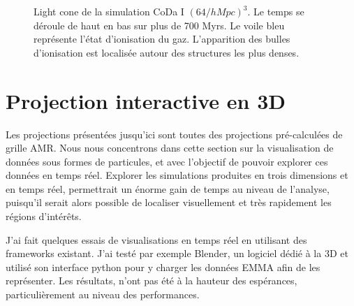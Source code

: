 \begin{figure}
        \caption[Light cone]{Light cone de la simulation CoDa I $(64/h Mpc)^3$. 
        Le temps se déroule de haut en bas sur plus de 700 Myrs.
        Le voile bleu représente l'état d'ionisation du gaz.
        L'apparition des bulles d'ionisation est localisée autour des structures les plus denses.
 }
 		\label{fig:lightcone}
\end{figure}





\section{Projection interactive en 3D}
%
%
%


Les projections présentées jusqu'ici sont toutes des projections pré-calculées de grille \ac{AMR}.
Nous nous concentrons dans cette section sur la visualisation de données sous formes de particules, et avec l'objectif de pouvoir explorer ces données en temps réel.
Explorer les simulations produites en trois dimensions et en temps réel, permettrait un énorme gain de temps au niveau de l'analyse, puisqu'il serait alors possible de localiser visuellement et très rapidement les régions d’intérêts.

J'ai fait quelques essais de visualisations en temps réel en utilisant des frameworks existant.
J'ai testé par exemple Blender, un logiciel dédié à la 3D et utilisé son interface python pour y charger les données EMMA afin de les représenter.
Les résultats, n'ont pas été à la hauteur des espérances, particulièrement au niveau des performances.

